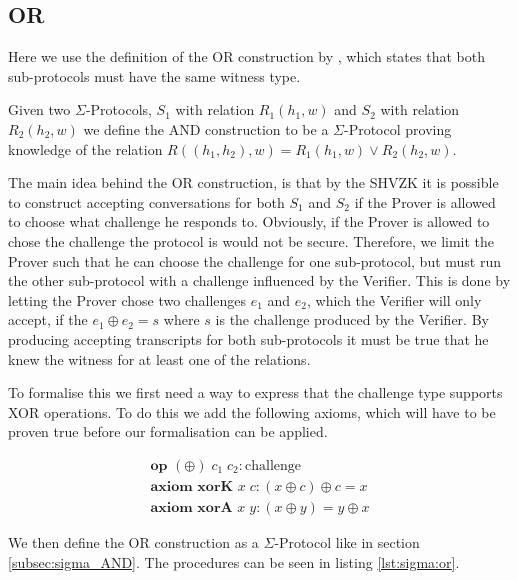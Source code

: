 \subsection{OR}
\label{subsec:sigma_OR}
Here we use the definition of the OR construction by \cite{on-sigma-protocols},
which states that both sub-protocols must have the same witness type.

Given two $\Sigma$-Protocols, $S_{1}$ with relation $R_{1}(h_{1},w)$ and
$S_{2}$ with relation $R_{2}(h_{2},w)$ we define the AND construction to be a
$\Sigma$-Protocol proving knowledge of the relation
$R((h_{1}, h_{2}), w) = R_{1}(h_{1}, w) \lor R_{2}(h_{2}, w)$.

The main idea behind the OR construction, is that by the SHVZK it is possible to
construct accepting conversations for both $S_{1}$ and $S_{2}$ if the Prover is
allowed to choose what challenge he responds to. Obviously, if the Prover is
allowed to chose the challenge the protocol is would not be secure. Therefore,
we limit the Prover such that he can choose the challenge for one sub-protocol,
but must run the other sub-protocol with a challenge influenced by the Verifier.
This is done by letting the Prover chose two challenges $e_{1}$ and $e_{2}$,
which the Verifier will only accept, if the $e_{1} \oplus e_{2} = s$ where $s$
is the challenge produced by the Verifier.
By producing accepting transcripts for both sub-protocols it must be true that
he knew the witness for at least one of the relations.

To formalise this we first need a way to express that the challenge type
supports XOR operations. To do this we add the following axioms, which will have
to be proven true before our formalisation can be applied.

\begin{gather}
  \textbf{op } (\oplus) \; c_{1} \; c_{2} : \text{challenge} \label{def:op:xor} \\
  \textbf{axiom xorK } x \; c : (x \oplus c) \oplus c = x \label{axiom:xorK} \\
  \textbf{axiom xorA } x \; y : (x \oplus y) = y \oplus x \label{axiom:xorA}
\end{gather}


We then define the OR construction as a $\Sigma$-Protocol like in section
\ref{subsec:sigma_AND}. The procedures can be seen in listing \ref{lst:sigma:or}.

